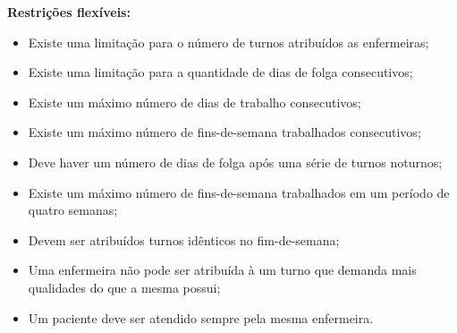 \textbf{Restrições flexíveis:}
\begin{itemize}
\item Existe uma limitação para o número de turnos atribuídos as enfermeiras; 
\item Existe uma limitação para a quantidade de dias de folga consecutivos; 
\item Existe um máximo número de dias de trabalho consecutivos;
\item Existe um máximo número de fins-de-semana trabalhados consecutivos;
\item Deve haver um número de dias de folga após uma série de turnos noturnos;
\item Existe um máximo número de fins-de-semana trabalhados em um período de quatro semanas; 
\item Devem ser atribuídos turnos idênticos no fim-de-semana;
\item Uma enfermeira não pode ser atribuída à um turno que demanda mais qualidades do que a mesma possui;
\item Um paciente deve ser atendido sempre pela mesma enfermeira.
\end{itemize}





